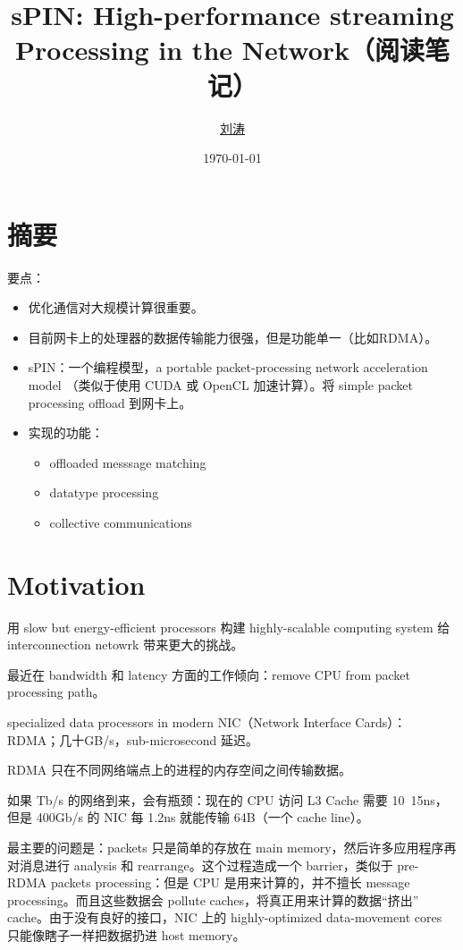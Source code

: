 \documentclass[cn,pad,11pt,green,geye]{../elegantnote}
\title{sPIN: High-performance streaming Processing in the Network（阅读笔记）}
\author{\href{https://github.com/lightjameslyy/}{刘涛}}
\institute{中科院计算所}
\date{\today}
\begin{document}
\maketitle


\section*{摘要}
要点：
\begin{itemize}
   \item 优化通信对大规模计算很重要。
   \item 目前网卡上的处理器的数据传输能力很强，但是功能单一（比如RDMA）。
   \item sPIN：一个编程模型，a portable packet-processing network acceleration model （类似于使用 CUDA 或 OpenCL 加速计算）。将 simple packet processing offload 到网卡上。
   \item 实现的功能：
      \begin{itemize}
         \item offloaded messsage matching
         \item datatype processing
         \item collective communications
      \end{itemize}
\end{itemize}

\section{Motivation}
用 slow but energy-efficient processors 构建 highly-scalable computing system 给 interconnection netowrk 带来更大的挑战。

最近在 bandwidth 和 latency 方面的工作倾向：remove CPU from packet processing path。

specialized data processors in modern NIC（Network Interface Cards）：RDMA；几十GB/s，sub-microsecond 延迟。

RDMA 只在不同网络端点上的进程的内存空间之间传输数据。

如果 Tb/s 的网络到来，会有瓶颈：现在的 CPU 访问 L3 Cache 需要 10~15ns，但是 400Gb/s 的 NIC 每 1.2ns 就能传输 64B（一个 cache line）。

最主要的问题是：packets 只是简单的存放在 main memory，然后许多应用程序再对消息进行 analysis 和 rearrange。这个过程造成一个 barrier，类似于 pre-RDMA packets processing：但是 CPU 是用来计算的，并不擅长 message processing。而且这些数据会 pollute caches，将真正用来计算的数据“挤出” cache。由于没有良好的接口，NIC 上的 highly-optimized data-movement cores 只能像瞎子一样把数据扔进 host memory。
\end{document}
